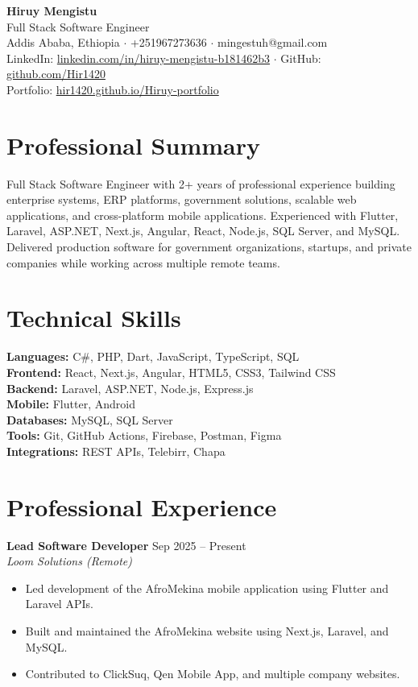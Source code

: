 \documentclass[11pt]{article}
\begin{document}
\begin{center}
{\LARGE \textbf{Hiruy Mengistu}}\\
\vspace{4pt}
{\large Full Stack Software Engineer}\\
Addis Ababa, Ethiopia $\cdot$ +251967273636 $\cdot$ mingestuh@gmail.com\\
LinkedIn: \href{https://www.linkedin.com/in/hiruy-mengistu-b181462b3/}{linkedin.com/in/hiruy-mengistu-b181462b3} $\cdot$
GitHub: \href{https://github.com/Hir1420}{github.com/Hir1420}\\
Portfolio: \href{https://hir1420.github.io/Hiruy-portfolio/}{hir1420.github.io/Hiruy-portfolio}
\end{center}

\section*{Professional Summary}
Full Stack Software Engineer with 2+ years of professional experience building enterprise systems, ERP platforms, government solutions, scalable web applications, and cross-platform mobile applications. Experienced with Flutter, Laravel, ASP.NET, Next.js, Angular, React, Node.js, SQL Server, and MySQL. Delivered production software for government organizations, startups, and private companies while working across multiple remote teams.

\section*{Technical Skills}
\textbf{Languages:} C\#, PHP, Dart, JavaScript, TypeScript, SQL\\
\textbf{Frontend:} React, Next.js, Angular, HTML5, CSS3, Tailwind CSS\\
\textbf{Backend:} Laravel, ASP.NET, Node.js, Express.js\\
\textbf{Mobile:} Flutter, Android\\
\textbf{Databases:} MySQL, SQL Server\\
\textbf{Tools:} Git, GitHub Actions, Firebase, Postman, Figma\\
\textbf{Integrations:} REST APIs, Telebirr, Chapa

\section*{Professional Experience}

\textbf{Lead Software Developer} \hfill Sep 2025 -- Present\\
\textit{Loom Solutions (Remote)}
\begin{itemize}
\item Led development of the AfroMekina mobile application using Flutter and Laravel APIs.
\item Built and maintained the AfroMekina website using Next.js, Laravel, and MySQL.
\item Contributed to ClickSuq, Qen Mobile App, and multiple company websites.
\end{itemize}
\end{document}
